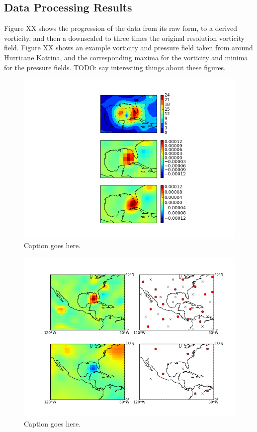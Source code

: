 \documentclass[pdftex,12pt,a4paper]{report}
\begin{document}
\subsection{Data Processing Results}

Figure XX shows the progression of the data from its raw form, to a derived vorticity, and then a
downscaled to three times the original resolution vorticity field. Figure XX shows an example
vorticity and pressure field taken from around Hurricane Katrina, and the corresponding maxima for
the vorticity and minima for the pressure fields. TODO: say interesting things about these figures.

\begin{figure}[hbp]
    \centering
    \includegraphics[width=\textwidth]{figures/katrina_data_proc}
    \caption{Caption goes here.}
    \label{fig:katrina_data_proc}
\end{figure}

\begin{figure}[hbp]
    \centering
    \includegraphics[width=\textwidth]{figures/katrina_max_mins}
    \caption{Caption goes here.}
    \label{fig:katrina_max_mins}
\end{figure}
\end{document}
